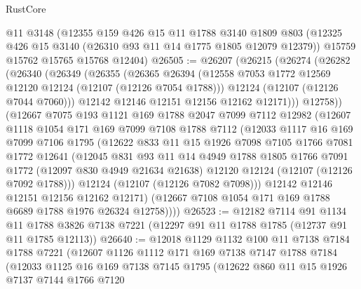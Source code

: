 \begin{lexlean}{RustCore}
\begin{coremodule}
    @11
    @3148
    (@12355
      @159
      @426
      @15
      @11
      @1788
      @3140
      @1809
      @803
      (@12325 @426 @15 @3140 (@26310 @93 @11 @14 @1775 @1805 @12079 @12379))
      @15759
      @15762
      @15765
      @15768
      @12404)
@26505 := @26207
    (@26215
      (@26274
        (@26282
          (@26340
            (@26349
              (@26355
                (@26365
                  @26394
                  (@12558 @7053 @1772 @12569 @12120 @12124 (@12107 (@12126 @7054 @1788)))
                  @12124
                  (@12107 (@12126 @7044 @7060)))
                @12142
                @12146
                @12151
                @12156
                @12162
                @12171)))
          @12758))
      (@12667
        @7075
        @193
        @1121
        @169
        @1788
        @2047
        @7099
        @7112
        @12982
        (@12607
          @1118
          @1054
          @171
          @169
          @7099
          @7108
          @1788
          @7112
          (@12033
            @1117
            @16
            @169
            @7099
            @7106
            @1795
            (@12622
              @833
              @11
              @15
              @1926
              @7098
              @7105
              @1766
              @7081
              @1772
              @12641
              (@12045
                @831
                @93
                @11
                @14
                @4949
                @1788
                @1805
                @1766
                @7091
                @1772
                (@12097 @830 @4949 @21634 @21638)
                @12120
                @12124
                (@12107 (@12126 @7092 @1788)))
              @12124
              (@12107 (@12126 @7082 @7098)))
            @12142
            @12146
            @12151
            @12156
            @12162
            @12171)
          (@12667 @7108 @1054 @171 @169 @1788 @6689 @1788 @1976 @26324 @12758))))
@26523 := @12182
    @7114
    @91
    @1134
    @11
    @1788
    @3826
    @7138
    @7221
    (@12297 @91 @11 @1788 @1785 (@12737 @91 @11 @1785 @12113))
@26640 := @12018
    @1129
    @1132
    @100
    @11
    @7138
    @7184
    @1788
    @7221
    (@12607
      @1126
      @1112
      @171
      @169
      @7138
      @7147
      @1788
      @7184
      (@12033
        @1125
        @16
        @169
        @7138
        @7145
        @1795
        (@12622
          @860
          @11
          @15
          @1926
          @7137
          @7144
          @1766
          @7120

\end{coremodule}
\end{lexlean}
